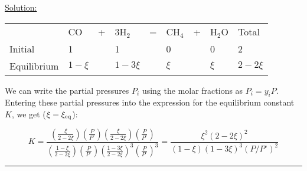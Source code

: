 \noindent
\underline{Solution:}

\begin{tabular}{lllllllll}
            & CO & + & 3H$_2$ & = & CH$_4$ & + & H$_2$O & Total\\
Initial     & 1  &   &      1 &   & 0      &   &  0     & 2\\
Equilibrium & $1-\xi$ & & $1 - 3\xi$ & & $\xi$ & & $\xi$ & $2 - 2\xi$\\
\end{tabular}

We can write the partial pressures $P_i$ using the molar fractions as $P_i = y_iP$. Entering these partial pressures into the expression for the equilibrium constant $K$, we get ($\xi = \xi_{\textnormal{eq}}$):

$$K = \frac{\left(\frac{\xi}{2-2\xi}\right)\left(\frac{P}{P^\circ}\right)\left(\frac{\xi}{2-2\xi}\right)\left(\frac{P}{P^\circ}\right)}{\left(\frac{1-\xi}{2-2\xi}\right)\left(\frac{P}{P^\circ}\right)\left(\frac{1-3\xi}{2-2\xi}\right)^3\left(\frac{P}{P^\circ}\right)^3} = \frac{\xi^2\left(2-2\xi\right)^2}{\left(1-\xi\right)\left(1-3\xi\right)^3\left(P/P^\circ\right)^2}$$

\hrule\vspace{0.5cm}
